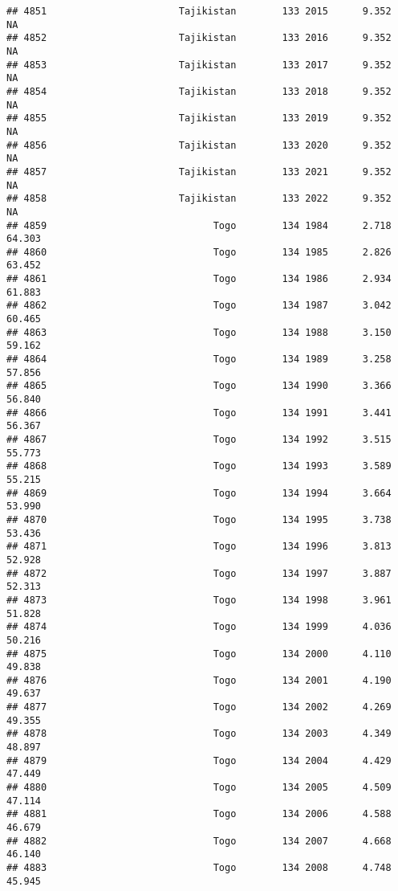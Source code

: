 \documentclass[
]{article}
\begin{document}
\begin{verbatim}
## 4851                       Tajikistan        133 2015      9.352         NA
## 4852                       Tajikistan        133 2016      9.352         NA
## 4853                       Tajikistan        133 2017      9.352         NA
## 4854                       Tajikistan        133 2018      9.352         NA
## 4855                       Tajikistan        133 2019      9.352         NA
## 4856                       Tajikistan        133 2020      9.352         NA
## 4857                       Tajikistan        133 2021      9.352         NA
## 4858                       Tajikistan        133 2022      9.352         NA
## 4859                             Togo        134 1984      2.718     64.303
## 4860                             Togo        134 1985      2.826     63.452
## 4861                             Togo        134 1986      2.934     61.883
## 4862                             Togo        134 1987      3.042     60.465
## 4863                             Togo        134 1988      3.150     59.162
## 4864                             Togo        134 1989      3.258     57.856
## 4865                             Togo        134 1990      3.366     56.840
## 4866                             Togo        134 1991      3.441     56.367
## 4867                             Togo        134 1992      3.515     55.773
## 4868                             Togo        134 1993      3.589     55.215
## 4869                             Togo        134 1994      3.664     53.990
## 4870                             Togo        134 1995      3.738     53.436
## 4871                             Togo        134 1996      3.813     52.928
## 4872                             Togo        134 1997      3.887     52.313
## 4873                             Togo        134 1998      3.961     51.828
## 4874                             Togo        134 1999      4.036     50.216
## 4875                             Togo        134 2000      4.110     49.838
## 4876                             Togo        134 2001      4.190     49.637
## 4877                             Togo        134 2002      4.269     49.355
## 4878                             Togo        134 2003      4.349     48.897
## 4879                             Togo        134 2004      4.429     47.449
## 4880                             Togo        134 2005      4.509     47.114
## 4881                             Togo        134 2006      4.588     46.679
## 4882                             Togo        134 2007      4.668     46.140
## 4883                             Togo        134 2008      4.748     45.945

\end{verbatim}
\end{document}
